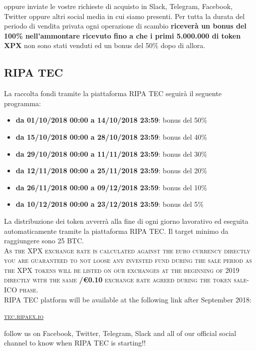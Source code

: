 \documentclass[11pt,fleqn,oneside]{book} %
\begin{document}
oppure inviate le vostre richieste di acquisto in Slack, Telegram, Facebook, Twitter oppure altri social media 
in cui siamo presenti.
Per tutta la durata del periodo di vendita privata ogni operazione di scambio \textbf{riceverà un bonus
del 100\% nell'ammontare ricevuto fino a che i primi 5.000.000 di token XPX} non sono stati venduti ed un bonus
del 50\% dopo di allora.

\subsection{RIPA TEC}
La raccolta fondi tramite la piattaforma RIPA TEC seguirà il seguente programma:
\begin{itemize}
	\item \textbf{da 01/10/2018 00:00 a 14/10/2018 23:59}: bonus del 50\% 
	\item \textbf{da 15/10/2018 00:00 a 28/10/2018 23:59}: bonus del 40\% 
	\item \textbf{da 29/10/2018 00:00 a 11/11/2018 23:59}: bonus del 30\% 
	\item \textbf{da 12/11/2018 00:00 a 25/11/2018 23:59}: bonus del 20\% 
	\item \textbf{da 26/11/2018 00:00 a 09/12/2018 23:59}: bonus del 10\% 
	\item \textbf{da 10/12/2018 00:00 a 23/12/2018 23:59}: bonus del 5\% 
\end{itemize}
\vspace{5mm}
La distribuzione dei token avverrà alla fine di ogni giorno lavorativo ed eseguita automaticamente
tramite la piattaforma RIPA TEC. Il target minimo da raggiungere sono 25 BTC.\\




\textsc{As the XPX exchange rate is calculated against the euro currency directly you are guaranteed to not loose any invested fund
during the sale period as the XPX tokens will be listed on our exchanges at the beginning of 2019 directly with the same \textbf{\PHP/\euro0.10}
exchange rate agreed during the token sale-ICO phase}.\\

RIPA TEC platform will be available at the following link after September 2018:
\begin{center}
	\href{https://tex.ripaex.io}{\textsc{tec.ripaex.io}}
\end{center}
follow us on Facebook, Twitter, Telegram, Slack and all of our official social channel to know when RIPA TEC is starting!!
\end{document}
